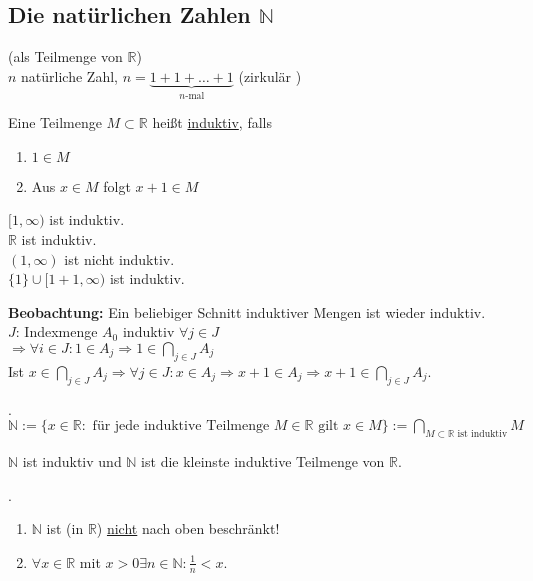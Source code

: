 \documentclass[../ana1.tex]{subfiles}
\begin{document}
\subsection{Die natürlichen Zahlen $\mathbb{N}$}
(als Teilmenge von $\mathbb{R}$)\\
$n$ natürliche Zahl, $n=\underbrace{1+1+\ldots + 1}_{n\text{-mal}}$ (zirkulär \Lightning)
\begin{defi}
	Eine Teilmenge $M\subset \mathbb{R}$ heißt \underline{induktiv}, falls
	\begin{enumerate}
		\item $1\in M$
		\item Aus $x\in M$ folgt $x+1 \in M$
	\end{enumerate}
\end{defi}
\begin{bsp}
	$[1,\infty)$ ist induktiv.\\
	$\mathbb{R}$ ist induktiv.\\
	$(1,\infty)$ ist nicht induktiv.\\
	$\{1\} \cup [1+1,\infty)$ ist induktiv.
\end{bsp}
\textbf{Beobachtung:} Ein beliebiger Schnitt induktiver Mengen ist wieder induktiv.\\
$J$: Indexmenge $A_0$ induktiv $\forall j\in J$\\
$\Rightarrow \forall i\in J: 1\in A_j \Rightarrow 1\in \underset{j\in J}{\bigcap} A_j$\\
Ist $x\in \underset{j\in J}{\bigcap} A_j\Rightarrow \forall j \in J: x\in A_j \Rightarrow x+1 \in A_j \Rightarrow x+1 \in \underset{j\in J}{\bigcap} A_j$.
\begin{defi} .\\ %
	$\mathbb{N} := \{x\in \mathbb{R}: \text{ für jede induktive Teilmenge } M\in\mathbb{R} \text{ gilt } x\in M\} := \underset{M\subset \mathbb{R}\text{ ist induktiv}}{\bigcap} M$
\end{defi}
\begin{bem}
	$\mathbb{N}$ ist induktiv und $\mathbb{N}$ ist die kleinste induktive Teilmenge von $\mathbb{R}$.
\end{bem}
\begin{satz} .%
	\begin{enumerate}
		\item $\mathbb{N}$ ist (in $\mathbb{R}$) \underline{nicht} nach oben beschränkt!
		\item $\forall x\in\mathbb{R}$ mit $x>0 \exists n\in \mathbb{N}: \frac{1}{n} < x$.
	\end{enumerate}
\end{satz}
\end{document}
